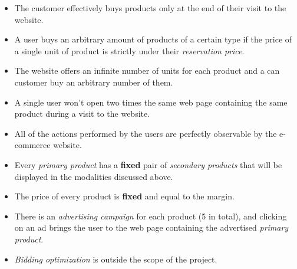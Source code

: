 \begin{itemize}
    \item The customer effectively buys products only at the end of their visit to the website.
    \item A user buys an arbitrary amount of products of a certain type if the price of a single unit of product is strictly under their \textit{reservation price}.
    \item The website offers an infinite number of units for each product and a can customer buy an arbitrary number of them.
    \item A single user won't open two times the same web page containing the same product during a visit to the website.
    \item All of the actions performed by the users are perfectly observable by the e-commerce website.
    \item Every \textit{primary product} has a \textbf{fixed} pair of \textit{secondary products} that will be displayed in the modalities discussed above.
    \item The price of every product is \textbf{fixed} and equal to the margin.
    \item There is an \textit{advertising campaign} for each product (5 in total), and clicking on an ad brings the user to the web page containing the advertised \textit{primary product}.
    \item \textit{Bidding optimization} is outside the scope of the project.
\end{itemize}

